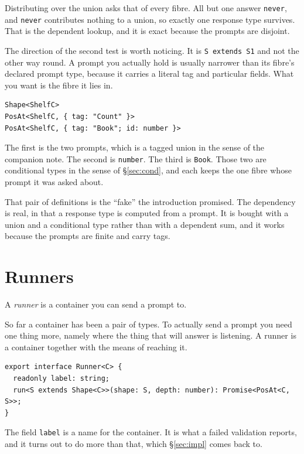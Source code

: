 \documentclass[11pt,a4paper]{article}
\begin{document}
\begin{pinkbox}
Distributing over the union asks that of every fibre. All but one answer \texttt{never}, and
\texttt{never} contributes nothing to a union, so exactly one response type survives. That is the
dependent lookup, and it is exact because the prompts are disjoint.

The direction of the second test is worth noticing. It is \texttt{S extends S1} and not the other
way round. A prompt you actually hold is usually narrower than its fibre's declared prompt type,
because it carries a literal tag and particular fields. What you want is the fibre it lies in.

\begin{lstlisting}[language=TS]
Shape<ShelfC>
PosAt<ShelfC, { tag: "Count" }>
PosAt<ShelfC, { tag: "Book"; id: number }>
\end{lstlisting}

The first is the two prompts, which is a tagged union in the sense of the companion note. The
second is \texttt{number}. The third is \texttt{Book}. Those two are conditional types in the sense
of \S\ref{sec:cond}, and each keeps the one fibre whose prompt it was asked about.

That pair of definitions is the ``fake'' the introduction promised. The dependency is real, in that a response
type is computed from a prompt. It is bought with a union and a conditional type rather than with a
dependent sum, and it works because the prompts are finite and carry tags.
\end{pinkbox}

\newpage

\section{Runners}
\label{sec:runner}

A \emph{runner} is a container you can send a prompt to.

So far a container has been a pair of types. To actually send a prompt you need one thing more,
namely where the thing that will answer is listening. A runner is a container together with the
means of reaching it.

\begin{lstlisting}[language=TS]
export interface Runner<C> {
  readonly label: string;
  run<S extends Shape<C>>(shape: S, depth: number): Promise<PosAt<C, S>>;
}
\end{lstlisting}

The field \texttt{label} is a name for the container. It is what a failed validation reports, and
it turns out to do more than that, which \S\ref{sec:impl} comes back to.
\end{document}
